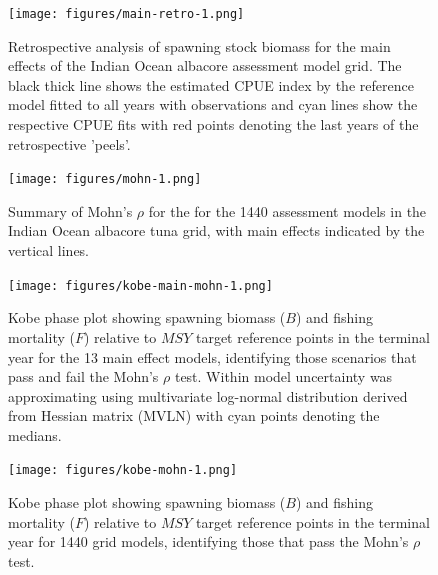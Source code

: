 \begin{figure}[ht!]\centering\texttt{[image: figures/main-retro-1.png]}  
\caption{Retrospective analysis of spawning stock biomass for the main effects of the Indian Ocean albacore assessment model grid. The black thick line shows the estimated CPUE index by the reference model fitted to all years with observations and cyan lines show the respective CPUE fits with red points denoting the last years of the retrospective 'peels'.}
\label{fig:retro}      
\end{figure}

\begin{figure}[ht!]\centering\texttt{[image: figures/mohn-1.png]}  \caption{Summary of Mohn's $\rho$ for the for the 1440 assessment models in the Indian Ocean albacore tuna grid, with main effects indicated by the vertical lines.} 
\label{fig:mohn}       
\end{figure}


\begin{figure}[ht!]\centering\texttt{[image: figures/kobe-main-mohn-1.png]} 
\caption{Kobe phase plot showing spawning biomass ($B$) and fishing mortality ($F$) relative to $MSY$ target reference points in the terminal year for the 13 main effect models, identifying those scenarios that pass and fail the Mohn's $\rho$ test. Within model uncertainty was approximating using multivariate log-normal distribution derived from Hessian matrix (MVLN) with cyan points denoting the medians. } 
\label{fig:kb-mohn}    
\end{figure}

\begin{figure}[ht!]\centering\texttt{[image: figures/kobe-mohn-1.png]} \caption{Kobe phase plot showing spawning biomass ($B$) and fishing mortality ($F$) relative to $MSY$ target reference points in the terminal year for 1440 grid models, identifying those that pass the Mohn's $\rho$ test.}
\label{fig:kobe}       
\end{figure}

